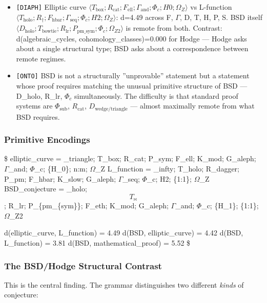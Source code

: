 \documentclass[12pt,a4paper]{article}
\begin{document}
\begin{itemize}
    \item \texttt{{[}DIAPH{]}} Elliptic curve $\langle T_{\text{box}}; R_{\text{cat}}; F_{\text{ell}}; \Gamma_{\text{and}}; \Phi_c; H0; \Omega_Z\rangle$ vs L-function $\langle T_{\text{holo}}; R_{\dagger}; F_{\text{hbar}}; \Gamma_{\text{seq}}; \Phi_c; H2; \Omega_Z\rangle$: d=4.49 across F, $\Gamma$, D, T, H, P, S. BSD itself $\langle D_{\text{holo}}; T_{\text{bowtie}}; R_{\text{lr}}; P_{\text{pm\_sym}}; \Phi_c; \Omega_{Z2}\rangle$ is remote from both. Contrast: d(algebraic\_cycles, cohomology\_classes)=0.000 for Hodge --- Hodge asks about a single structural type; BSD asks about a correspondence between remote regimes.
    \item \texttt{{[}ONTO{]}} BSD is not a structurally ''unprovable'' statement but a statement whose proof requires matching the unusual primitive structure of BSD --- D\_holo, R\_lr, $\Phi_c$ simultaneously. The difficulty is that standard proof systems are $\Phi_{\text{sub}}$, $R_{\text{cat}}$, $D_{\text{wedge/triangle}}$ --- almost maximally remote from what BSD requires.
\end{itemize}

\subsubsection{Primitive Encodings}

\$
elliptic\_curve = \langleD\_triangle; T\_box;   R\_cat;   P\_sym; F\_ell;  K\_mod;  G\_aleph; $\Gamma$\_and; $\Phi$\_c;   \{H\_0\}; n:m; $\Omega$\_Z\rangle
L\_function     = \langleD\_infty;   T\_holo;  R\_dagger; P\_pm;  F\_hbar; K\_slow; G\_aleph; $\Gamma$\_seq; $\Phi$\_c;   H2; \{1:1\}; $\Omega$\_Z\rangle
BSD\_conjecture = \langleD\_holo;    $$T_{\bowtie}$$; R\_lr;    P\_\{pm\_\{sym\}\}; F\_eth;  K\_mod;  G\_aleph; $\Gamma$\_and; $\Phi$\_c;   \{H\_1\}; \{1:1\}; $\Omega$\_Z2\rangle

d(elliptic\_curve, L\_function) = 4.49
d(BSD, elliptic\_curve)        = 4.42
d(BSD, L\_function)            = 3.81
d(BSD, mathematical\_proof)    = 5.52
\$

\subsubsection{The BSD/Hodge Structural Contrast}

This is the central finding. The grammar distinguishes two different \emph{kinds} of conjecture:
\end{document}
